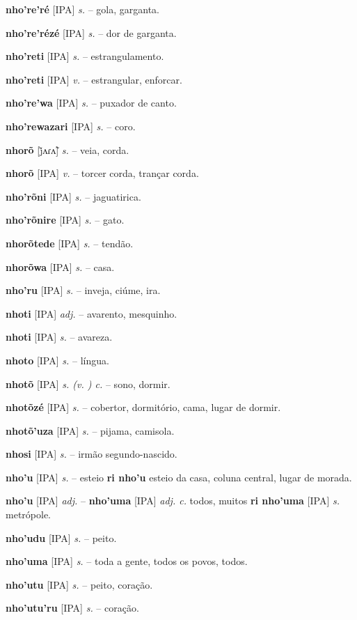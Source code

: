 \textbf{nho're'ré} [IPA] \textit{s.} -- gola, garganta.

\textbf{nho're'rézé} [IPA] \textit{s.} -- dor de garganta.

\textbf{nho'reti} [IPA] \textit{s.} -- estrangulamento.

\textbf{nho'reti} [IPA] \textit{v.} -- estrangular, enforcar.

\textbf{nho're'wa} [IPA] \textit{s.} -- puxador de canto.

\textbf{nho'rewazari} [IPA] \textit{s.} -- coro.

\textbf{nhorõ} [j̃ʌɾʌ̃] \textit{s.} -- veia, corda.

\textbf{nhorõ} [IPA] \textit{v.} -- torcer corda, trançar corda.

\textbf{nho'rõni} [IPA] \textit{s.} -- jaguatirica.

\textbf{nho'rõnire} [IPA] \textit{s.} -- gato.

\textbf{nhorõtede} [IPA] \textit{s.} -- tendão.

\textbf{nhorõwa} [IPA] \textit{s.} -- casa.

\textbf{nho'ru} [IPA] \textit{s.} -- inveja, ciúme, ira.

\textbf{nhoti} [IPA] \textit{adj.} -- avarento, mesquinho.

\textbf{nhoti} [IPA] \textit{s.} -- avareza.

\textbf{nhoto} [IPA] \textit{s.} -- língua.

\textbf{nhotõ} [IPA] \textit{s. (v. ) c.} -- sono, dormir.

\textbf{nhotõzé} [IPA] \textit{s.} -- cobertor, dormitório, cama, lugar de dormir.

\textbf{nhotõ'uza} [IPA] \textit{s.} -- pijama, camisola.

\textbf{nhosi} [IPA] \textit{s.} -- irmão segundo-nascido.

\textbf{nho'u} [IPA] \textit{s.} -- esteio  \textbf{ri nho'u} esteio da casa, coluna central, lugar de morada.

\textbf{nho'u} [IPA] \textit{adj.} -- \textbf{nho'uma} [IPA] \textit{adj. c.} todos, muitos  \textbf{ri nho'uma} [IPA] \textit{s.} metrópole.

\textbf{nho'udu} [IPA] \textit{s.} -- peito.

\textbf{nho'uma} [IPA] \textit{s.} -- toda a gente, todos os povos, todos.

\textbf{nho'utu} [IPA] \textit{s.} -- peito, coração.

\textbf{nho'utu'ru} [IPA] \textit{s.} -- coração.

